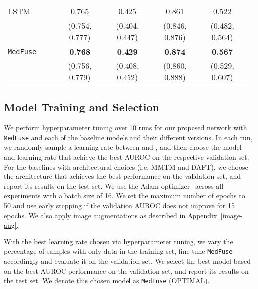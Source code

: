 \documentclass[pmlr]{jmlr}
\begin{document}
\begin{table*}[t!]
{\begin{tabular}{l c c c c| c c c}
        \hline
     LSTM &     &   & 0.765   & 0.425  & 0.861   &0.522  \\
      &  &   &  (0.754, 0.777)  &  (0.404, 0.447) &(0.846, 0.876)  & (0.482, 0.564) \\
\texttt{MedFuse} &   &  & \textbf{0.768}  & \textbf{0.429} & \textbf{0.874}  &\textbf{0.567}  \\
        &   &  &  (0.756, 0.779) &  (0.408, 0.452)& (0.860, 0.888) & (0.529, 0.607) \\
       \bottomrule
    \end{tabular}}
    \label{tab:univsmulti} \vspace{-3mm}
\end{table*}


\subsection{Model Training and Selection}
We perform hyperparameter tuning over 10 runs for our proposed network with \texttt{MedFuse} and each of the baseline models and their different versions. In each run, we randomly sample a learning rate between  and , and then choose the model and learning rate that achieve the best AUROC on the respective validation set. For the baselines with architectural choices (i.e. MMTM and DAFT), we choose the architecture that achieves the best performance on the validation set, and report its results on the test set. We use the Adam optimizer~\citep{kingma2014adam} across all experiments with a batch size of 16. We set the maximum number of epochs to 50 and use early stopping if the validation AUROC does not improve for 15 epochs. We also apply image augmentations as described in Appendix~\ref{image-aug}. 




With the best learning rate chosen via hyperparameter tuning, we vary the percentage of samples with  only data in the  training set, fine-tune \texttt{MedFuse} accordingly and evaluate it on the validation set. We select the best model based on the best AUROC performance on the  validation set, and report its results on the test set. We denote this chosen model as \texttt{MedFuse} (OPTIMAL). 
\end{document}
